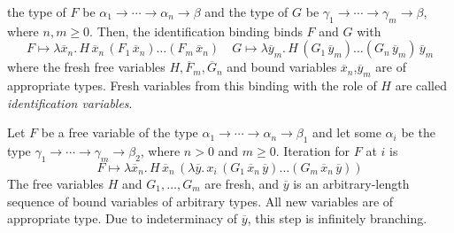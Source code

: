 \begin{description}[itemsep=1\jot]
    the type of $F$ be $\alpha_1 \rightarrow \cdots \rightarrow \alpha_n
    \rightarrow \beta$ and the type of $G$ be $\gamma_1 \rightarrow \cdots
    \rightarrow \gamma_m \rightarrow \beta$, where $n,m\geq 0$. Then, the identification binding binds
    $F$ and $G$ with
    \begin{equation*}
        F \mapsto \lambda \overline{x}_n. \, H \, \overline{x}_n \, (F_1 \, \overline{x}_n)
        \ldots (F_m \, \overline{x}_n) \quad
        G \mapsto \lambda \overline{y}_m. \,
        H \, (G_1 \, \overline{y}_m) \ldots (G_n \, \overline{y}_m) \, \overline{y}_m
    \end{equation*}
    where the fresh free variables $H,\overline{F}_m,\overline{G}_n$ and bound
    variables $\overline{x}_n$,$\overline{y}_m$ are of appropriate types. 
    Fresh variables from this binding with the role of $H$ are called \emph{identification variables}.
    \item[Iteration for $F$]
    Let $F$ be a free variable of the type $\alpha_1 \rightarrow \cdots
    \rightarrow \alpha_n \rightarrow \beta_1$ and let some $\alpha_i$ be the
    type $\gamma_1 \rightarrow \cdots \rightarrow \gamma_m \rightarrow
    \beta_2$, where $n>0$ and $m\geq 0$. Iteration for $F$ at $i$ is  
    \[ F \mapsto \lambda \overline{x}_n.\,H\,\overline{x}_n \, (\lambda
    \overline{y}.\,x_i \, (G_1 \, \overline{x}_n \, \overline{y}) \ldots (G_m \,
    \overline{x}_n \, \overline{y}) )\]
    The free variables $H$ and $G_1, \ldots,
    G_m$ are fresh, and $\overline{y}$ is an arbitrary-length sequence of bound
    variables of arbitrary types. All new variables are of
    appropriate type. Due to indeterminacy of $\overline{y}$, this step is
    infinitely branching. 
    

\end{description}

